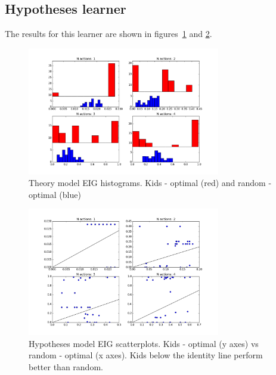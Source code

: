 \documentclass[11pt, a4paper]{article}
\begin{document}
\clearpage
\subsection*{Hypotheses learner}
The results for this learner are shown in figures~\ref{fig:hh} and \ref{fig:hs}.%
\begin{figure}[h!]
\begin{center}
\includegraphics[width=0.75\textwidth]{../Plots/IG_hyp_hist.png}
\caption{Theory model EIG histograms. Kids - optimal (red) and random - optimal (blue)}
\label{fig:hh}
\end{center}
\end{figure}
\begin{figure}[h!]
\begin{center}
\includegraphics[width=0.75\textwidth]{../Plots/IG_hyp_scat.png}
\caption{Hypotheses model EIG scatterplots. Kids - optimal (y axes) vs random - optimal (x axes). Kids below the identity line perform better than random.}
\label{fig:hs}
\end{center}
\end{figure}
\end{document}
